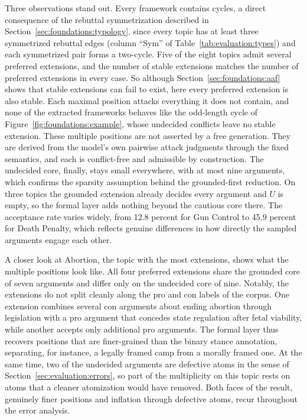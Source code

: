 Three observations stand out. Every framework contains cycles, a direct
consequence of the rebuttal symmetrization described in
Section~\ref{sec:foundations:typology}, since every topic has at least three
symmetrized rebuttal edges (column ``Sym'' of
Table~\ref{tab:evaluation:types}) and each symmetrized pair forms a two-cycle.
Five of the eight topics admit
several preferred extensions, and the number of stable extensions matches the
number of preferred extensions in every case. So although
Section~\ref{sec:foundations:aaf} shows that stable extensions can fail to
exist, here every preferred extension is also stable. Each maximal position
attacks everything it does not contain, and none of the extracted frameworks
behaves like the odd-length cycle of Figure~\ref{fig:foundations:example}, whose
undecided conflicts leave no stable extension. These multiple positions are not
asserted by a free generation. They are derived from the model's own pairwise
attack judgments through the fixed semantics, and each is conflict-free and
admissible by construction. The undecided core, finally, stays small
everywhere, with at most nine arguments, which confirms the sparsity
assumption behind the grounded-first reduction. On three topics the grounded extension already
decides every argument and $U$ is empty, so the formal layer adds nothing
beyond the cautious core there. The acceptance rate varies widely, from 12.8
percent for Gun Control to 45.9 percent for Death Penalty, which reflects
genuine differences in how directly the sampled arguments engage each other.

A closer look at Abortion, the topic with the most extensions, shows what the
multiple positions look like. All four preferred extensions share the grounded
core of seven arguments and differ only on the undecided core of nine. Notably,
the extensions do not split cleanly along the pro and con labels of the corpus.
One extension combines several con arguments about ending abortion through
legislation with a pro argument that concedes state regulation after fetal
viability, while another accepts only additional pro arguments. The formal
layer thus recovers positions that are finer-grained than the binary stance
annotation, separating, for instance, a legally framed camp from a
morally framed one. At the same time, two of the undecided arguments are
defective atoms in the sense of Section~\ref{sec:evaluation:errors}, so part of
the multiplicity on this topic rests on atoms that a cleaner atomization would
have removed. Both faces of the result, genuinely finer positions and
inflation through defective atoms, recur throughout the error analysis.


